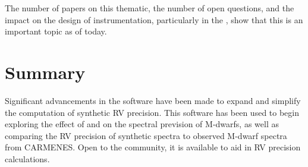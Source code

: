 The number of papers on this thematic, the number of open questions, and the impact on the design of instrumentation, particularly in the \nir{}, show that this is an important topic as of today.
  
















\section{Summary}
Significant advancements in the \eniric{} software have been made to expand and simplify the computation of synthetic {RV} precision.
This software has been used to begin exploring the effect of \Logg{} and \feh{} on the spectral prevision of M-dwarfs, as well as comparing the RV precision of synthetic spectra to observed M-dwarf spectra from {CARMENES}.
Open to the community, it is available to aid in {RV} precision calculations.
